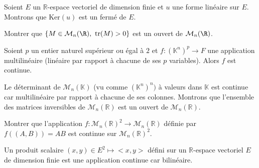 \documentclass[a4paper,10pt]{report}
\begin{document}
\begin{ex} Soient $E$ un $\mathbb{R}$-espace vectoriel de dimension finie et $u$ une forme linéaire sur $E$. Montrons que $\textrm{Ker}(u)$ est un fermé de $E$.

%
%

\vspace{5cm}
\end{ex}

\begin{exa} Montrer que $\{ M\in{\cal M}_n(\R), \ \textrm{tr}(M)>0\}$ est un ouvert de ${\cal M}_n(\R)$.
\end{exa}


\begin{thm} Soient $p$ un entier naturel supérieur ou égal à $2$ et $f : (\mathbb{K}^n)^p \rightarrow F$ une application multilinéaire (linéaire par rapport à chacune de ses $p$ variables). Alors $f$ est continue.
\end{thm}

\begin{ex} Le déterminant de $\mathcal{M}_n(\mathbb{K})$ (vu comme $(\mathbb{K}^n)^n)$ à valeurs dans $\mathbb{K}$ est continue car multilinéaire par rapport à chacune de ses colonnes. Montrons que l'ensemble des matrices inversibles de $\mathcal{M}_n(\mathbb{R})$ est un ouvert de $\mathcal{M}_n(\mathbb{R})$.

\vspace{4cm}
%
\end{ex}

\begin{exa} Montrer que l'application $f : \mathcal{M}_n(\mathbb{R})^2 \rightarrow \mathcal{M}_n(\mathbb{R})$ définie par $f((A,B))= AB$ est continue sur $\mathcal{M}_n(\mathbb{R})^2$.
\end{exa}

\begin{rem} Un produit scalaire $(x,y) \in E^2 \longmapsto <x,y>$ défini sur un $\mathbb{R}$-espace vectoriel $E$ de dimension finie est une application continue car bilinéaire.
\end{rem}
\end{document}
